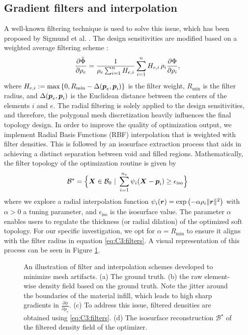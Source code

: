 \subsection{Gradient filters and interpolation}
A well-known filtering technique is used to solve this issue, which has been proposed by Sigmund et al. \cite{Bendsoe2003}. The design sensitivities are modified based on a weighted average filtering scheme \cite{Gain2013Dec,Bendsoe2003}:
%
\begin{equation}
\frac{\partial \tilde{\Phi}}{\partial {\rho_e}} = \frac{1}{\rho_e \sum^n_{i=1} H_{e,i}} \sum^n_{i=1} H_{e,i} \,\rho_i \frac{\partial {\Phi}}{\partial {\rho_i}},
\label{eq:C3:filters}
\end{equation}
%
where $H_{e,i} := \textrm{max} \left\{0, R_{\textrm{min}} - \Delta({\boldsymbol{p}}_e,{\boldsymbol{p}}_i)\right\}$ is the filter weight, $R_{\textrm{min}}$ is the filter radius, and $\Delta({\boldsymbol{p}}_e,{\boldsymbol{p}}_i)$ is the Euclidean distance between the centers of the elements $i$ and $e$. The radial filtering is solely applied to the design sensitivities, and therefore, the polygonal mesh discretization heavily influences the final topology design. In order to improve the quality of optimization output, we implement Radial Basis Functions (RBF) interpolation that is weighted with filter densities. This is followed by an isosurface extraction process that aids in achieving a distinct separation between void and filled regions. Mathematically, the filter topology of the optimization routine is given by 
%
\begin{equation}
\mathcal{B}^\star = \Big\{ {\boldsymbol{X}} \in \mathcal{B}_0 ~
|~ \sum_{i=1}^{n_e} \psi_i({\boldsymbol{X}} - {\boldsymbol{p}}_i) \ge \epsilon_\textrm{iso}\Big\}
\end{equation}
%
where we explore a radial interpolation function $\psi_i({\boldsymbol{r}}) = \exp\left( - \alpha \rho_i \lVert{\boldsymbol{r}}\rVert^2 \right)$ with $\alpha > 0$ a tuning parameter, and $\epsilon_{\textrm{iso}}$ is the isosurface value. The parameter $\alpha$ enables users to regulate the thickness (or radial dilation) of the optimized soft topology. For our specific investigation, we opt for $\alpha = R_\textrm{min}$ to ensure it aligns with the filter radius in equation \eqref{eq:C3:filters}. A visual representation of this process can be seen in Figure \ref{fig:C3:topo_filtering}.

\begin{figure}[!t]
  \centering
  \vspace{4mm}
  
  \caption{An illustration of filter and interpolation schemes developed to minimize mesh artifacts. (a) The ground truth. (b) the raw element-wise density field based on the ground truth. Note the jitter around the boundaries of the material infill, which leads to high sharp gradients in $\tfrac{\partial \phi}{\partial \rho_e}$. (c) To address this issue, filtered densities are obtained using \eqref{eq:C3:filters}. (d) The isosurface reconstruction $\mathcal{B}^\star$ of the filtered density field of the optimizer.}
  \label{fig:C3:topo_filtering}
\end{figure}

